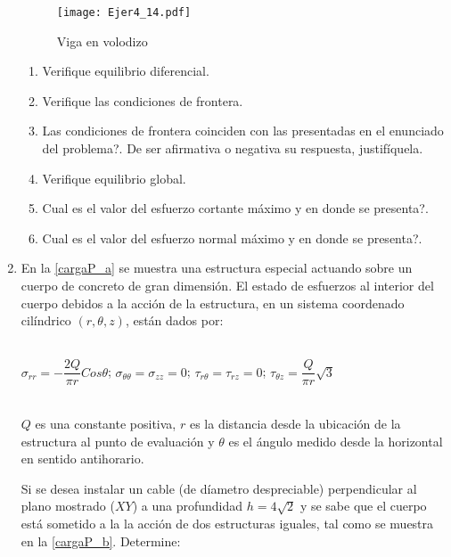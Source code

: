 \documentclass[../notas medios.tex]{subfiles}
\begin{document}
\begin{enumerate}
\begin{figure}[H]
	\centering
	\texttt{[image: Ejer4\_14.pdf]} 
	\caption{Viga en volodizo}
	\label{viga:voladizo}
\end{figure}
%
	\begin{enumerate}
		\item Verifique equilibrio diferencial.
		\item Verifique las condiciones de frontera.
		\item \textquestiondown Las condiciones de frontera coinciden con las presentadas en el enunciado del problema?. De ser afirmativa o negativa su respuesta, justif\'iquela.
		\item Verifique equilibrio global.
		\item \textquestiondown Cual es el valor del esfuerzo cortante m\'aximo y en donde se presenta?. 
		\item \textquestiondown Cual es el valor del esfuerzo normal m\'aximo y en donde se presenta?.
	\end{enumerate}
%
\item \label{punto15} En la \cref{cargaP_a} se muestra una estructura
especial actuando sobre un cuerpo de concreto de gran dimensi\'on. El estado de esfuerzos al interior del cuerpo debidos a la acci\'on de la estructura, en un sistema coordenado cil\'indrico $(r,{\theta},z)$, est\'an dados por:\\\\
%
\begin{large}
	\hspace*{10mm}$\sigma_{rr}= -\dfrac{2Q}{\pi r} Cos \theta$; \hspace*{5mm}
	$\sigma_{\theta\theta} = \sigma_{zz} = 0$; \hspace*{5mm}
	$\tau_{r\theta}= \tau_{rz}= 0 $; \hspace*{5mm}
	$\tau_{\theta{z}} = \dfrac{Q}{\pi r} \sqrt{3}$ \\\\
\end{large}
%
$Q$ es una constante positiva, $r$ es la distancia desde la ubicaci\'on de la estructura al punto de evaluaci\'on y $\theta$ es el \'angulo medido desde la horizontal en sentido antihorario. 
%
\begin{figure}[H]
	\centering
		\hspace{1.0cm}
	\label{cargaP_concreto} 
\end{figure}
%
Si se desea instalar un cable (de d\'iametro despreciable) perpendicular al plano mostrado ($XY$) a una profundidad $h = 4 \sqrt{2}$ y se sabe que el cuerpo está sometido a la 
 la acci\'on de dos estructuras iguales, tal como se muestra en la \cref{cargaP_b}. Determine: \\


\end{enumerate}
\end{document}
